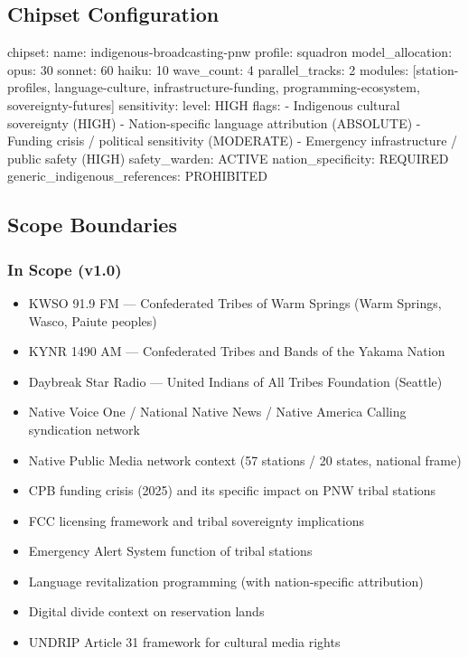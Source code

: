 \documentclass[11pt,letterpaper]{article}
\begin{document}
\subsection{Chipset Configuration}

\begin{asciibox}
chipset:
  name: indigenous-broadcasting-pnw
  profile: squadron
  model_allocation:
    opus: 30%
    sonnet: 60%
    haiku: 10%
  wave_count: 4
  parallel_tracks: 2
  modules: [station-profiles, language-culture, infrastructure-funding,
            programming-ecosystem, sovereignty-futures]
  sensitivity:
    level: HIGH
    flags:
      - Indigenous cultural sovereignty (HIGH)
      - Nation-specific language attribution (ABSOLUTE)
      - Funding crisis / political sensitivity (MODERATE)
      - Emergency infrastructure / public safety (HIGH)
  safety_warden: ACTIVE
  nation_specificity: REQUIRED
  generic_indigenous_references: PROHIBITED
\end{asciibox}

\subsection{Scope Boundaries}

\subsubsection{In Scope (v1.0)}
\begin{itemize}[leftmargin=2em]
  \item KWSO 91.9 FM — Confederated Tribes of Warm Springs (Warm Springs, Wasco, Paiute peoples)
  \item KYNR 1490 AM — Confederated Tribes and Bands of the Yakama Nation
  \item Daybreak Star Radio — United Indians of All Tribes Foundation (Seattle)
  \item Native Voice One / National Native News / Native America Calling syndication network
  \item Native Public Media network context (57 stations / 20 states, national frame)
  \item CPB funding crisis (2025) and its specific impact on PNW tribal stations
  \item FCC licensing framework and tribal sovereignty implications
  \item Emergency Alert System function of tribal stations
  \item Language revitalization programming (with nation-specific attribution)
  \item Digital divide context on reservation lands
  \item UNDRIP Article 31 framework for cultural media rights
\end{itemize}
\end{document}
